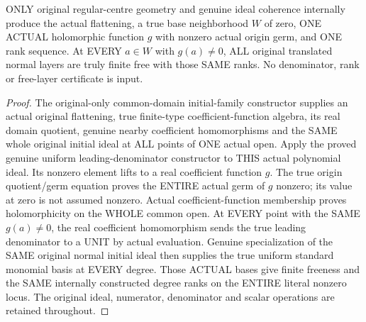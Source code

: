 \begin{theorem}
\label{hir:original-real-uniform-normal-degrees-retained-analytic-denominator}
\leanok
ONLY original regular-centre geometry and genuine ideal coherence internally
produce the actual flattening, a true base neighborhood $W$ of zero, ONE
ACTUAL holomorphic function $g$ with nonzero actual origin germ, and ONE
rank sequence. At EVERY $a\in W$ with $g(a)\ne0$, ALL original translated
normal layers are truly finite free with those SAME ranks. No denominator,
rank or free-layer certificate is input.
\end{theorem}
\begin{proof}
The original-only common-domain initial-family constructor supplies an
actual original flattening, true finite-type coefficient-function algebra,
its real domain quotient, genuine nearby coefficient homomorphisms and
the SAME whole original initial ideal at ALL points of ONE actual open.
Apply the proved genuine uniform leading-denominator constructor to THIS
actual polynomial ideal. Its nonzero element lifts to a real coefficient
function $g$. The true origin quotient/germ equation proves the ENTIRE
actual germ of $g$ nonzero; its value at zero is not assumed nonzero.
Actual coefficient-function membership proves holomorphicity on the WHOLE
common open. At EVERY point with the SAME $g(a)\ne0$, the real coefficient
homomorphism sends the true leading denominator to a UNIT by actual
evaluation. Genuine specialization of the SAME original normal initial
ideal then supplies the true uniform standard monomial basis at EVERY
degree. Those ACTUAL bases give finite freeness and the SAME internally
constructed degree ranks on the ENTIRE literal nonzero locus. The original
ideal, numerator, denominator and scalar operations are retained throughout.
\end{proof}

